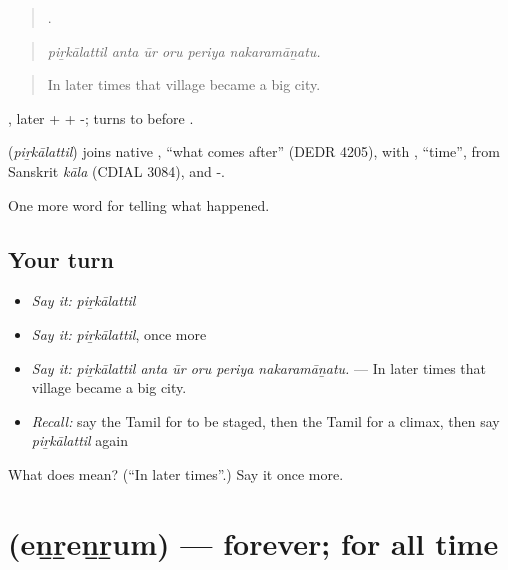 \begin{quote}
     .
\end{quote}

\begin{quote}
\emph{piṟkālattil anta ūr oru periya nakaramāṉatu.}
\end{quote}

\begin{quote}
In later times that village became a big city.
\end{quote}

, later +  + -;  turns to  before .

\begin{cousinweb}
\textbf{} (\emph{piṟkālattil}) joins native , \textquotedblleft{}what comes after\textquotedblright{} (DEDR 4205), with , \textquotedblleft{}time\textquotedblright{}, from Sanskrit \emph{kāla} (CDIAL 3084), and -.
\end{cousinweb}

\begin{grammarlens}[title={What you've built}]
One more word for telling what happened.
\end{grammarlens}

\subsection*{Your turn}
\begin{itemize}
\raggedright
  \item \emph{Say it:} \emph{piṟkālattil}
  \item \emph{Say it:} \emph{piṟkālattil}, once more
  \item \emph{Say it:} \emph{piṟkālattil anta ūr oru periya nakaramāṉatu.} — In later times that village became a big city.
  \item \emph{Recall:} say the Tamil for to be staged, then the Tamil for a climax, then say \emph{piṟkālattil} again
\end{itemize}

\begin{tcolorbox}[breakable,colback=teal!4,colframe=teal!35!black,title={Before you move on}]
What does  mean? (\textquotedblleft{}In later times\textquotedblright{}.) Say it once more.
\end{tcolorbox}
\section[\texorpdfstring{\ta{என்றென்றும்} (eṉṟeṉṟum)}{என்றென்றும் (eṉṟeṉṟum)}]{ (eṉṟeṉṟum) — forever; for all time}


